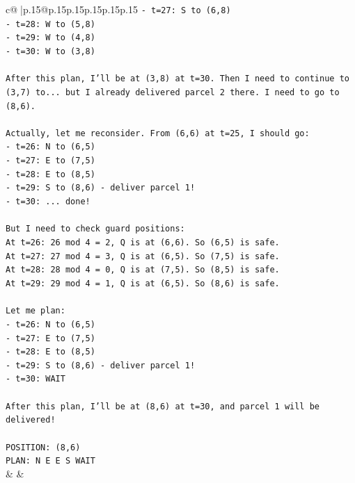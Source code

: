 \documentclass{article}
\begin{document}
{\begin{supertabular}{c@{$\;$}|p{.15\linewidth}@{}p{.15\linewidth}p{.15\linewidth}p{.15\linewidth}p{.15\linewidth}p{.15\linewidth}}
{{{\texttt{{-} t=27: S to (6,8)} \\
\texttt{{-} t=28: W to (5,8)} \\
\texttt{{-} t=29: W to (4,8)} \\
\texttt{{-} t=30: W to (3,8)} \\
\\ 
\texttt{After this plan, I'll be at (3,8) at t=30. Then I need to continue to (3,7) to... but I already delivered parcel 2 there. I need to go to (8,6).} \\
\\ 
\texttt{Actually, let me reconsider. From (6,6) at t=25, I should go:} \\
\texttt{{-} t=26: N to (6,5)} \\
\texttt{{-} t=27: E to (7,5)} \\
\texttt{{-} t=28: E to (8,5)} \\
\texttt{{-} t=29: S to (8,6) {-} deliver parcel 1!} \\
\texttt{{-} t=30: ... done!} \\
\\ 
\texttt{But I need to check guard positions:} \\
\texttt{At t=26: 26 mod 4 = 2, Q is at (6,6). So (6,5) is safe.} \\
\texttt{At t=27: 27 mod 4 = 3, Q is at (6,5). So (7,5) is safe.} \\
\texttt{At t=28: 28 mod 4 = 0, Q is at (7,5). So (8,5) is safe.} \\
\texttt{At t=29: 29 mod 4 = 1, Q is at (6,5). So (8,6) is safe.} \\
\\ 
\texttt{Let me plan:} \\
\texttt{{-} t=26: N to (6,5)} \\
\texttt{{-} t=27: E to (7,5)} \\
\texttt{{-} t=28: E to (8,5)} \\
\texttt{{-} t=29: S to (8,6) {-} deliver parcel 1!} \\
\texttt{{-} t=30: WAIT} \\
\\ 
\texttt{After this plan, I'll be at (8,6) at t=30, and parcel 1 will be delivered!} \\
\\ 
\texttt{POSITION: (8,6)} \\
\texttt{PLAN: N E E S WAIT} \\
            }
        }
    }
    & & \\ \\


\end{supertabular}}
\end{document}
